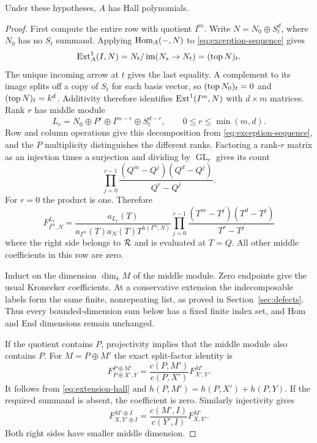 \begin{proposition}\label{prop:exception-recursion}
Under these hypotheses, $A$ has Hall polynomials.
\end{proposition}
\begin{proof}
First compute the entire row with quotient $I^m$. Write $N=N_0\oplus S_t^d$, where $N_0$ has no $S_t$ summand. Applying $\operatorname{Hom}_A(-,N)$ to \eqref{eq:exception-sequence} gives
\[
 \operatorname{Ext}_A^1(I,N)=N_t/\operatorname{im}(N_s\to N_t)=(\operatorname{top} N)_t.
\]
The unique incoming arrow at $t$ gives the last equality. A complement to its image splits off a copy of $S_t$ for each basis vector, so $(\operatorname{top} N_0)_t=0$ and $(\operatorname{top} N)_t=k^d$. Additivity therefore identifies $\operatorname{Ext}^1(I^m,N)$ with $d\times m$ matrices. Rank $r$ has middle module
\[
 L_r=N_0\oplus P^r\oplus I^{m-r}\oplus S_t^{d-r},
 \qquad 0\le r\le\min(m,d).
\]
Row and column operations give this decomposition from \eqref{eq:exception-sequence}, and the $P$ multiplicity distinguishes the different ranks. Factoring a rank-$r$ matrix as an injection times a surjection and dividing by $\operatorname{GL}_r$ gives its count
\[
 \prod_{j=0}^{r-1}\frac{(Q^m-Q^j)(Q^d-Q^j)}{Q^r-Q^j}.
\]
For $r=0$ the product is one. Therefore
\begin{equation}\label{eq:injective-row}
 F^{L_r}_{I^m,N}=
 \frac{a_{L_r}(T)}{a_{I^m}(T)a_N(T)T^{h(I^m,N)}}
 \prod_{j=0}^{r-1}\frac{(T^m-T^j)(T^d-T^j)}{T^r-T^j}
\end{equation}
where the right side belongs to $\mathcal R$ and is evaluated at $T=Q$. All other middle coefficients in this row are zero.

Induct on the dimension $\dim_kM$ of the middle module. Zero endpoints give the usual Kronecker coefficients. At a conservative extension the indecomposable labels form the same finite, nonrepeating list, as proved in Section~\ref{sec:defects}. Thus every bounded-dimension sum below has a fixed finite index set, and Hom and End dimensions remain unchanged.

If the quotient contains $P$, projectivity implies that the middle module also contains $P$. For $M=P\oplus M'$ the exact split-factor identity is
\begin{equation}\label{eq:projective-strip}
 F^{P\oplus M'}_{P\oplus X',Y}
 =\frac{c(P,M')}{c(P,X')}F^{M'}_{X',Y}.
\end{equation}
It follows from \eqref{eq:extension-hall} and
$h(P,M')=h(P,X')+h(P,Y)$. If the required summand is absent, the coefficient is zero. Similarly injectivity gives
\begin{equation}\label{eq:injective-strip}
 F^{M'\oplus I}_{X,Y'\oplus I}
 =\frac{c(M',I)}{c(Y',I)}F^{M'}_{X,Y'}.
\end{equation}
Both right sides have smaller middle dimension.


\end{proof}
